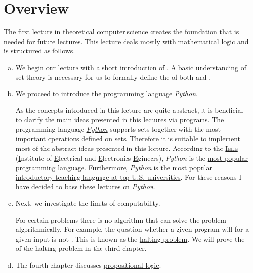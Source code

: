 \section{Overview} 
The first lecture in theoretical computer science creates the foundation that is needed for future lectures.
This lecture deals mostly with mathematical logic and is structured as follows.
\begin{enumerate}[(a)]
\item We begin our lecture with a short introduction of .  A basic understanding of set theory is
      necessary for us to formally define the  of both  and .
\item We proceed to introduce the programming language \textsl{Python}.

      As the concepts introduced in this lecture are quite abstract, it is beneficial to clarify the main
      ideas presented in this lectures via programs.  The programming language
      \href{http://python.org}{\textsl{Python}} supports sets together with the most important operations
      defined on sets.  Therefore it is
      suitable to implement most of the abstract ideas presented in this lecture.  According to the 
      \href{http://ieee.org}{\textsc{Ieee}} (\underline{I}nstitute of \underline{E}lectrical and
      \underline{E}lectronics \underline{E}gineers),  \textsl{Python} is the 
      \href{https://spectrum.ieee.org/static/interactive-the-top-programming-languages-2019}{most popular programming language}.
      Furthermore, \textsl{Python}
      \href{https://cacm.acm.org/blogs/blog-cacm/176450-python-is-now-the-most-popular-introductory-teaching-language-at-top-u-s-universities/fulltext}{is
      the most popular introductory teaching language at top U.S. universities}.   For these reasons I
      have decided to base these lectures on \textsl{Python}.

\item Next, we investigate the limits of computability.

      For certain problems there is no algorithm that can solve the problem algorithmically. 
      For example, the question whether a given program will  for a given input is not
      .  This is known as the \href{https://en.wikipedia.org/wiki/Halting_problem}{halting problem}.  
      We will prove the  of the halting problem in the third chapter. 
\item The fourth chapter discusses \href{https://en.wikipedia.org/wiki/Propositional_calculus}{propositional logic}.


\end{enumerate}
